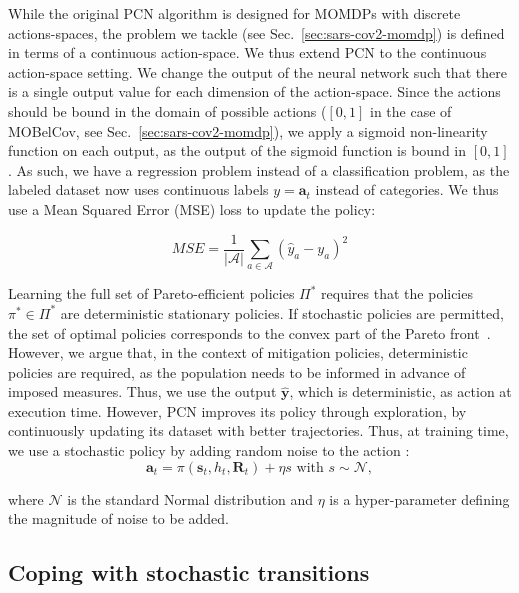 \documentclass{article}
\renewcommand{\cite}[1]{\citep{#1}}
\newcommand{\mdpstate}{\mathbf{s}}
\newcommand{\momdpreturn}{\mathbf{R}}
\newcommand{\mdpaction}{\mathbf{a}}
\newcommand{\momdpname}{MOBelCov}
\begin{document}
While the original PCN algorithm is designed for MOMDPs with discrete actions-spaces, the problem we tackle (see Sec.~\ref{sec:sars-cov2-momdp}) is defined in terms of a continuous action-space. We thus extend PCN to the continuous action-space setting.
We change the output of the neural network such that there is a single output value for each dimension of the action-space. Since the actions should be bound in the domain of possible actions ($[0,1]$ in the case of \momdpname, see Sec.~\ref{sec:sars-cov2-momdp}), we apply a sigmoid non-linearity function on each output, as the output of the sigmoid function is bound in $[0,1]$.
As such, we have a regression problem instead of a classification problem, as the labeled dataset now uses continuous labels $y = \mdpaction_t$ instead of categories. We thus use a Mean Squared Error (MSE) loss to update the policy:

\begin{equation}
    MSE = \frac{1}{|\mathcal{A}|}\sum_{a \in \mathcal{A}}{(\hat{y}_a - y_a)^2}
\end{equation}

Learning the full set of Pareto-efficient policies $\Pi^*$ requires that the policies $\pi^* \in \Pi^*$ are deterministic stationary policies. If stochastic policies are permitted, the set of optimal policies corresponds to the convex part of the Pareto front~\cite{roijers2013survey}. However, we argue that, in the context of mitigation policies, deterministic policies are required, as the population needs to be informed in advance of imposed measures. Thus, we use the output $\mathbf{\hat{y}}$, which is deterministic, as action at execution time. However, PCN improves its policy through exploration, by continuously updating its dataset with better trajectories. Thus, at training time, we use a stochastic policy by adding random noise to the action \cite{lillicrap2015continuous}: 
\begin{equation}
    \mdpaction_t = \pi(\mdpstate_t, h_t, \momdpreturn_t) + \eta s \text { with } s \sim \mathcal{N},
\end{equation}

where $\mathcal{N}$ is the standard Normal distribution and $\eta$ is a hyper-parameter defining the magnitude of noise to be added.

\subsection{Coping with stochastic transitions}
\label{sec:pcn-stochastic}
\end{document}
